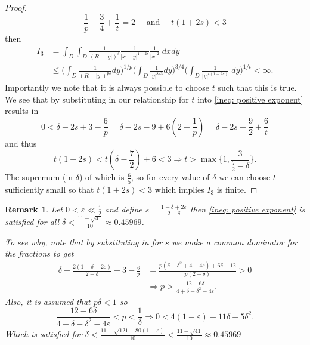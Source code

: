 \documentclass[11pt, reqno]{article}
\newtheorem{remark}[theorem]{Remark}
\begin{document}
\begin{proof}
    \[
        \frac{1}{p} + \frac{3}{4} + \frac{1}{t} = 2 \quad \text{ and } \quad t(1+2s) < 3
    \]
    then
    \begin{align*}
        I_3 &= \int_D\int_D \frac{1}{(R-|y|)^\delta}\frac{1}{|x-y|^{1+2s}}\frac{1}{|x|^2}\;dxdy\\
        &\leq \Big(\int_D\frac{1}{(R-|y|)^{p\delta}}dy\Big)^{1/p}\Big(\int_D \frac{1}{|y|^{8/3}}dy\Big)^{3/4}\Big(\int_D\frac{1}{|y|^{t(1+2s)}}\;dy)^{1/t} < \infty.
    \end{align*}
    Importantly we note that it is always possible to choose $t$ such that this is true. We see that by substituting in our relationship for $t$ into \eqref{ineq: positive exponent}  results in 
    \[
        0 < \delta - 2s + 3 - \frac{6}{p} = \delta - 2s - 9 + 6(2-\frac{1}{p}) = \delta -2s - \frac{9}{2} + \frac{6}{t}
    \]
    and thus 
    \[ 
        t(1+2s) < t(\delta - \frac{7}{2}) + 6 < 3 \Rightarrow t > \max\{1, \frac{3}{\frac{7}{2} - \delta}\}.
    \]
    The supremum (in $\delta$) of which is $\frac{6}{5}$, so for every value of $\delta$ we can choose $t$ sufficiently small so that $t(1+2s) < 3$ which implies $I_3$ is finite.
\end{proof}
\begin{remark}\label{remark: Hs regularity of g}
    Let $0 < \varepsilon \ll \frac{1}{2}$ and define $s = \frac{1-\delta + 2\varepsilon}{2-\delta}$ then \eqref{ineq: positive exponent} is satisfied for all $\delta < \frac{11- \sqrt{41}}{10} \approx 0.45969$.

    To see why, note that by substituting in for $s$ we make a common dominator for the fractions to get
    \begin{align*}
        \delta - \frac{2(1-\delta + 2\varepsilon)}{2-\delta} + 3 - \frac{6}{p} &=
        \frac{p(\delta - \delta^2 + 4 - 4\varepsilon) + 6\delta - 12}{p(2-\delta)} > 0\\
        &\Rightarrow p > \frac{12 - 6\delta}{4 + \delta - \delta^2 - 4\varepsilon}.
    \end{align*}
    Also, it is assumed that $p\delta < 1$ so 
    \[
        \frac{12 - 6\delta}{4 + \delta - \delta^2 - 4\varepsilon} < p < \frac{1}{\delta} \Rightarrow 0 < 4(1-\varepsilon)-11\delta + 5\delta^2.
    \]
    Which is satisfied for $\delta < \frac{11 - \sqrt{121 - 80(1-\varepsilon)}}{10} < \frac{11 - \sqrt{41}}{10}\approx 0.45969$
\end{remark}
\end{document}
